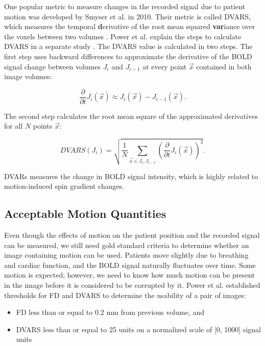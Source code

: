 One popular metric to measure changes in the recorded signal due to patient motion was developed by Smyser et al. in 2010. Their metric is called DVARS, which measures the temporal \textbf{d}erivative of the root mean squared \textbf{var}iance over the voxels between two volumes \cite{Smyser2010}. Power et al. explain the steps to calculate DVARS in a separate study \cite{Power2012}. The DVARS value is calculated in two steps. The first step uses backward differences to approximate the derivative of the BOLD signal change between volumes $J_i$ and $J_{i-1}$ at every point $\vec{x}$ contained in both image volumes:

\begin{equation}
\frac{\partial}{\partial t} J_i(\vec{x}) \approx J_i(\vec{x}) - J_{i-1}(\vec{x}).
\end{equation}

The second step calculates the root mean square of the approximated derivatives for all $N$ points $\vec{x}$:

\begin{equation}
DVARS(J_i) = \sqrt{ \frac{1}{N} \sum_{\vec{x} \in J_i, J_{i-1}} \left( \frac{\partial}{\partial t} J_i(\vec{x}) \right)^2 }.
\end{equation}

DVARs measures the change in BOLD signal intensity, which is highly related to motion-induced spin gradient changes. 

\subsection{Acceptable Motion Quantities}



Even though the effects of motion on the patient position and the recorded signal can be measured, we still need gold standard criteria to determine whether an image containing motion can be used. Patients move slightly due to breathing and cardiac function, and the BOLD signal naturally fluctuates over time. Some motion is expected; however, we need to know how much motion can be present in the image before it is considered to be corrupted by it. Power et al. established thresholds for FD and DVARS to determine the usability of a pair of images:
\begin{itemize}
\item FD less than or equal to 0.2 mm from previous volume, and
\item DVARS less than or equal to 25 units on a normalized scale of [0, 1000] signal units \cite{Power2014}
\end{itemize}

